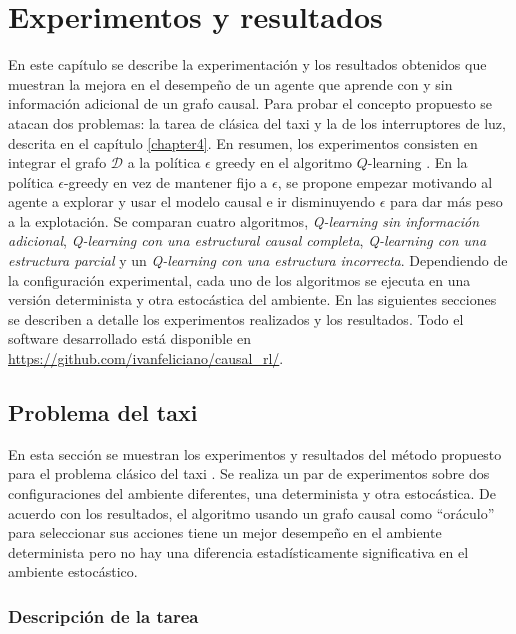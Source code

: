 \chapter{Experimentos y resultados}\label{chapter5}

\graphicspath{{Chapter5/Figs/}}


En este capítulo se describe la experimentación y los resultados obtenidos
que muestran la mejora en el desempeño de un agente que aprende
con y sin información adicional de un grafo causal.
Para probar el concepto propuesto se atacan dos problemas: la tarea de clásica del taxi \cite{Dietterich:2000:HRL:1622262.1622268} y la de los
interruptores de luz, descrita en el capítulo \ref{chapter4}.
En resumen, los experimentos consisten en integrar el grafo $\mathcal{D}$ a la política $\epsilon$ greedy
en el algoritmo $Q$-learning \cite{watkins1992q}.
En la política $\epsilon$-greedy en vez de mantener fijo a $\epsilon$, se propone empezar motivando al agente a explorar y usar
el modelo causal e ir disminuyendo $\epsilon$ para dar más peso a la explotación.
Se comparan cuatro algoritmos, \textit{Q-learning sin información
adicional}, \textit{Q-learning con una estructural causal completa}, \textit{Q-learning con una estructura parcial} y un \textit{Q-learning con una estructura incorrecta}.
Dependiendo de la configuración experimental, cada uno de los algoritmos se ejecuta en una versión determinista y otra estocástica del ambiente. 
En las siguientes secciones se describen a detalle los experimentos realizados y los resultados. Todo el software desarrollado está 
disponible en \url{https://github.com/ivanfeliciano/causal_rl/}.


\section{Problema del taxi}

En esta sección se muestran los experimentos y resultados del método propuesto para el problema clásico del taxi \cite{Dietterich:2000:HRL:1622262.1622268}.
Se realiza un par de experimentos sobre dos configuraciones del ambiente diferentes,
una determinista y otra estocástica. De acuerdo con los resultados, 
el algoritmo usando un grafo causal como ``oráculo'' para seleccionar sus acciones
tiene un mejor desempeño en el ambiente determinista pero no hay una diferencia estadísticamente significativa en el ambiente estocástico.

\subsection{Descripción de la tarea}

